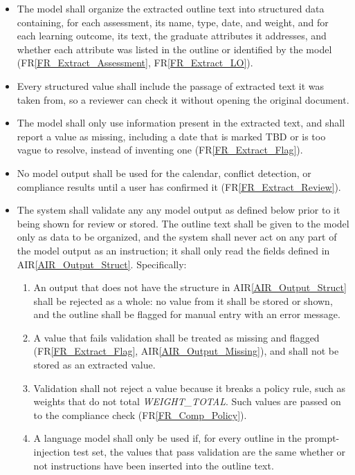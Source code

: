 \documentclass[12pt]{article}
\newcommand{\rref}[1]{FR\ref{#1}}
\newcounter{airnum} %
\newcommand{\airref}[1]{AIR\ref{#1}}
\begin{document}
\begin{itemize}
\item[AIR\refstepcounter{airnum}\theairnum \label{AIR_Output_Struct}:] The model shall organize the extracted outline text into structured data containing, for each assessment, its name, type, date, and weight, and for each learning outcome, its text, the graduate attributes it addresses, and whether each attribute was listed in the outline or identified by the model (\rref{FR_Extract_Assessment}, \rref{FR_Extract_LO}).
\item[AIR\refstepcounter{airnum}\theairnum \label{AIR_Output_Source}:] Every structured value shall include the passage of extracted text it was taken from, so a reviewer can check it without opening the original document.
\item[AIR\refstepcounter{airnum}\theairnum \label{AIR_Output_Missing}:] The model shall only use information present in the extracted text, and shall report a value as missing, including a date that is marked TBD or is too vague to resolve, instead of inventing one (\rref{FR_Extract_Flag}).
\item[AIR\refstepcounter{airnum}\theairnum \label{AIR_Output_Review}:] No model output shall be used for the calendar, conflict detection, or compliance results until a user has confirmed it (\rref{FR_Extract_Review}).
\item[AIR\refstepcounter{airnum}\theairnum \label{AIR_Output_Validation}:] The
system shall validate any any model output as defined below prior to it being
shown for review or stored. The outline text shall be given to the model only as
data to be organized, and the system shall never act on any part of the model
output as an instruction; it shall only read the fields defined in
\airref{AIR_Output_Struct}. Specifically:
  \begin{enumerate}
  \item[(a)] An output that does not have the structure in \airref{AIR_Output_Struct} shall be rejected as a whole: no value from it shall be stored or shown, and the outline shall be flagged for manual entry with an error message.
  \item[(b)] A value that fails validation shall be treated as missing and flagged (\rref{FR_Extract_Flag}, \airref{AIR_Output_Missing}), and shall not be stored as an extracted value.
  \item[(c)] Validation shall not reject a value because it breaks a policy rule, such as weights that do not total \textit{WEIGHT\_\allowbreak{}TOTAL}. Such values are passed on to the compliance check (\rref{FR_Comp_Policy}).
  \item[(d)] A language model shall only be used if, for every outline in the prompt-injection test set, the values that pass validation are the same whether or not instructions have been inserted into the outline text.
  \end{enumerate}
\end{itemize}
\end{document}
